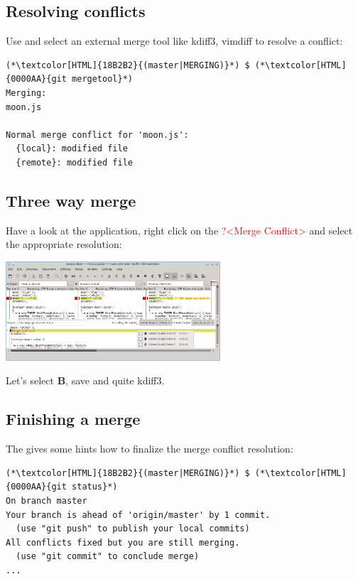 \subsection{Resolving conflicts}
\begin{frame}[fragile]
  \subslidetitle
  Use  and select an external merge tool like kdiff3, vimdiff to resolve a conflict:

  \begin{lstlisting}
(*\textcolor[HTML]{18B2B2}{(master|MERGING)}*) $ (*\textcolor[HTML]{0000AA}{git mergetool}*)
Merging:
moon.js

Normal merge conflict for 'moon.js':
  {local}: modified file
  {remote}: modified file
\end{lstlisting}

\end{frame}

\subsection{Three way merge}
\begin{frame}[fragile]
  \subslidetitle
  Have a look at the  application, right click on the \textcolor{red}{?<Merge Conflict>} and select the appropriate resolution:
  \newline \vspace{1em}
  \centerline{\includegraphics[width=8cm]{../screen/kdiff3.png}}

  Let's select \textbf{B}, save and quite kdiff3.
\end{frame}

\subsection{Finishing a merge}
\begin{frame}[fragile]
  \subslidetitle
  The  gives some hints how to finalize the merge conflict resolution:
  \begin{lstlisting}
(*\textcolor[HTML]{18B2B2}{(master|MERGING)}*) $ (*\textcolor[HTML]{0000AA}{git status}*)
On branch master
Your branch is ahead of 'origin/master' by 1 commit.
  (use "git push" to publish your local commits)
All conflicts fixed but you are still merging.
  (use "git commit" to conclude merge)
...
\end{lstlisting}
\end{frame}

